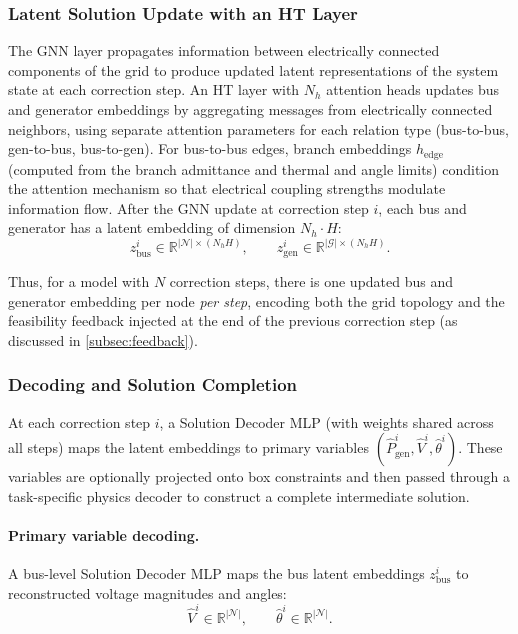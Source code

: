 \subsubsection{Latent Solution Update with an HT Layer}
The GNN layer propagates information between electrically connected components of the grid to produce updated latent representations of the system state at each correction step. An HT layer with $N_h$ attention heads updates bus and generator embeddings by aggregating messages from electrically connected neighbors, using separate attention parameters for each relation type (bus-to-bus, gen-to-bus, bus-to-gen). For bus-to-bus edges, branch embeddings $h_{\text{edge}}$ (computed from the branch admittance and thermal and angle limits) condition the attention mechanism so that electrical coupling strengths modulate information flow. After the GNN update at correction step $i$, each bus and generator has a latent embedding of dimension $N_h \cdot H$:
\begin{equation}
\label{eq:transformer}
z_{\text{bus}}^i \in \mathbb{R}^{|\mathcal{N}| \times (N_h H)}, \qquad
z_{\text{gen}}^i \in \mathbb{R}^{|\mathcal{G}| \times (N_h H)}.
\end{equation}

Thus, for a model with $N$ correction steps, there is one updated bus and generator embedding per node \emph{per step}, encoding both the grid topology and the feasibility feedback injected at the end of the previous correction step (as discussed in \cref{subsec:feedback}).

\subsubsection{Decoding and Solution Completion}
\label{subsubsec:decoding}

At each correction step $i$, a Solution Decoder MLP (with weights shared across all steps) maps the latent embeddings to primary variables
$(\hat{P}_{\mathrm{gen}}^i,\hat{V}^i,\hat{\theta}^i)$.
These variables are optionally projected onto box constraints and then passed through a task-specific physics decoder to construct a complete intermediate solution.

\paragraph{Primary variable decoding.}

A bus-level Solution Decoder MLP maps the bus latent embeddings
$z_{\mathrm{bus}}^i$
to reconstructed voltage magnitudes and angles:
\begin{equation}
\hat{V}^i \in \mathbb{R}^{|\mathcal{N}|},
\qquad
\hat{\theta}^i \in \mathbb{R}^{|\mathcal{N}|}.
\end{equation}

